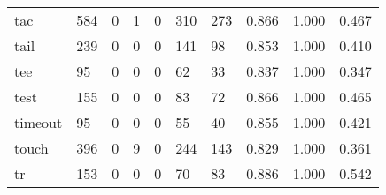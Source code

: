 \begin{longtable}{lp{2.0cm}p{2.0cm}p{2.0cm}p{2.0cm}p{2.0cm}p{2.0cm}p{2.0cm}p{2.0cm}p{2.0cm}}
tac       &                    584 &                                             0 &                                            1 &                                           0 &                                          310 &                                        273 &                                0.866 &                                  1.000 &                                0.467 \\
tail      &                    239 &                                             0 &                                            0 &                                           0 &                                          141 &                                         98 &                                0.853 &                                  1.000 &                                0.410 \\
tee       &                     95 &                                             0 &                                            0 &                                           0 &                                           62 &                                         33 &                                0.837 &                                  1.000 &                                0.347 \\
test      &                    155 &                                             0 &                                            0 &                                           0 &                                           83 &                                         72 &                                0.866 &                                  1.000 &                                0.465 \\
timeout   &                     95 &                                             0 &                                            0 &                                           0 &                                           55 &                                         40 &                                0.855 &                                  1.000 &                                0.421 \\
touch     &                    396 &                                             0 &                                            9 &                                           0 &                                          244 &                                        143 &                                0.829 &                                  1.000 &                                0.361 \\
tr        &                    153 &                                             0 &                                            0 &                                           0 &                                           70 &                                         83 &                                0.886 &                                  1.000 &                                0.542 \\

\end{longtable}

